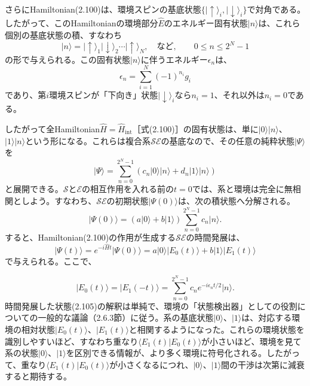 さらにHamiltonian(2.100)は、環境スピンの基底状態$\{\lvert\uparrow\rangle_i,\lvert\downarrow\rangle_i\}$で対角である。したがって、このHamiltonianの環境部分$\hat E$のエネルギー固有状態$\lvert n\rangle$は、これら個別の基底状態の積、すなわち
\begin{equation}\lvert n\rangle=\lvert\uparrow\rangle_1\lvert\downarrow\rangle_2\cdots\lvert\uparrow\rangle_N,\quad\text{など},\qquad0\le n\le2^N-1\tag{2.101}\end{equation}
の形で与えられる。この固有状態$\lvert n\rangle$に伴うエネルギー$\epsilon_n$は、
\begin{equation}\epsilon_n=\sum_{i=1}^N(-1)^{n_i}g_i\tag{2.102}\end{equation}
であり、第$i$環境スピンが「下向き」状態$\lvert\downarrow\rangle_i$なら$n_i=1$、それ以外は$n_i=0$である。

したがって全Hamiltonian$\hat H=\hat H_{\mathrm{int}}$［式(2.100)］の固有状態は、単に$\lvert0\rangle\lvert n\rangle$、$\lvert1\rangle\lvert n\rangle$という形になる。これらは複合系$\mathcal{SE}$の基底なので、その任意の純粋状態$\lvert\Psi\rangle$を
\begin{equation}\lvert\Psi\rangle=\sum_{n=0}^{2^N-1}(c_n\lvert0\rangle\lvert n\rangle+d_n\lvert1\rangle\lvert n\rangle)\tag{2.103}\end{equation}
と展開できる。$\mathcal S$と$\mathcal E$の相互作用を入れる前の$t=0$では、系と環境は完全に無相関としよう。すなわち、$\mathcal{SE}$の初期状態$\lvert\Psi(0)\rangle$は、次の積状態へ分解される。
\begin{equation}\lvert\Psi(0)\rangle=(a\lvert0\rangle+b\lvert1\rangle)\sum_{n=0}^{2^N-1}c_n\lvert n\rangle.\tag{2.104}\end{equation}
すると、Hamiltonian(2.100)の作用が生成する$\mathcal{SE}$の時間発展は、
\begin{equation}\lvert\Psi(t)\rangle=e^{-i\hat Ht}\lvert\Psi(0)\rangle=a\lvert0\rangle\lvert E_0(t)\rangle+b\lvert1\rangle\lvert E_1(t)\rangle\tag{2.105}\end{equation}
で与えられる。ここで、

\hypertarget{srcpage:91}{}\label{srcpage:91}
\begin{equation}\lvert E_0(t)\rangle=\lvert E_1(-t)\rangle=\sum_{n=0}^{2^N-1}c_n e^{-i\epsilon_n t/2}\lvert n\rangle.\tag{2.106}\end{equation}
時間発展した状態(2.105)の解釈は単純で、環境の「状態検出器」としての役割についての一般的な議論（2.6.3節）に従う。系の基底状態$\lvert0\rangle$、$\lvert1\rangle$は、対応する環境の相対状態$\lvert E_0(t)\rangle$、$\lvert E_1(t)\rangle$と相関するようになった。これらの環境状態を識別しやすいほど、すなわち重なり$\langle E_1(t)\vert E_0(t)\rangle$が小さいほど、環境を見て系の状態$\lvert0\rangle$、$\lvert1\rangle$を区別できる情報が、より多く環境に符号化される。したがって、重なり$\langle E_1(t)\vert E_0(t)\rangle$が小さくなるにつれ、$\lvert0\rangle$、$\lvert1\rangle$間の干渉は次第に減衰すると期待する。

